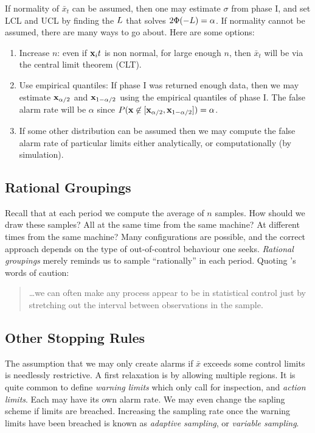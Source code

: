 If normality of $\bar{x}_t$ can be assumed, then one may estimate $\sigma$ from phase I, and set LCL and UCL by finding the $L$ that solves $2\Phi(-L)=\alpha$.
If normality cannot be assumed, there are many ways to go about. Here are some options:
\begin{enumerate}
\item Increase $n$: even if $\mathbf{x}_it$ is non normal, for large enough $n$, then $\bar{x}_t$ will be via the central limit theorem (CLT).
\item Use empirical quantiles: If phase I was returned enough data, then we may estimate $\mathbf{x}_{\alpha/2}$ and $\mathbf{x}_{1-\alpha/2}$ using the empirical quantiles of phase I. The false alarm rate will be $\alpha$ since $P(\mathbf{x} \not \in [\mathbf{x}_{\alpha/2},\mathbf{x}_{1-\alpha/2}])=\alpha$.
\item If some other distribution can be assumed then we may compute the false alarm rate of particular limits either analytically, or computationally (by simulation).
\end{enumerate}




\subsection{Rational Groupings}
\label{sec:rational_grouping}
Recall that at each period we compute the average of $n$ samples. 
How should we draw these samples? All at the same time from the same machine?
At different times from the same machine?
Many configurations are possible, and the correct approach depends on the type of out-of-control behaviour one seeks. 
\emph{Rational groupings} merely reminds us to sample ``rationally'' in each period. 
Quoting \cite{montgomery_introduction_2007}'s words of caution:
\begin{quotation}
\dots we can often make any process appear to be in statistical control just by stretching out the interval between observations in the sample.
\end{quotation}






\subsection{Other Stopping Rules}
\label{sec:stopping_rules}

The assumption that we may only create alarms if $\bar{x}$ exceeds some control limits is needlessly restrictive.
A first relaxation is by allowing multiple regions.
It is quite common to define \emph{warning limits} which only call for inspection, and \emph{action limits}. Each may have its own alarm rate.
We may even change the sapling scheme if limits are breached. Increasing the sampling rate once the warning limits have been breached is known as \emph{adaptive sampling}, or \emph{variable sampling}.




